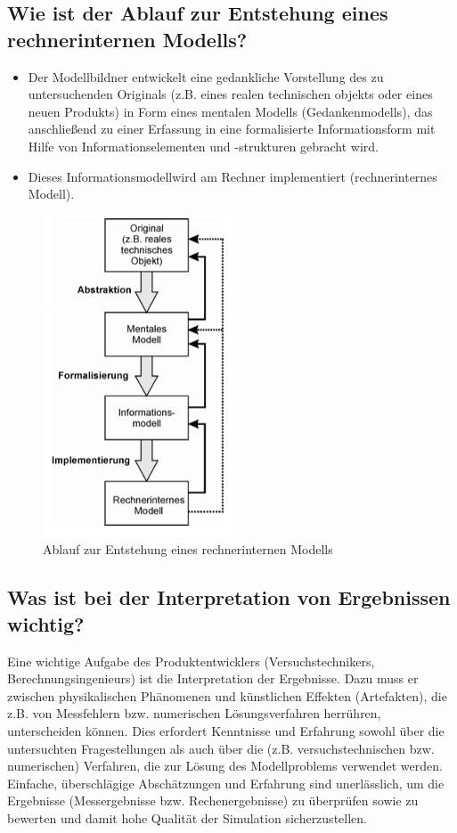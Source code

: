 \subsection{Wie ist der Ablauf zur Entstehung eines rechnerinternen Modells?}
\begin{itemize}
    \item Der Modellbildner entwickelt eine gedankliche Vorstellung des zu untersuchenden Originals (z.B. eines realen 
    technischen objekts oder eines neuen Produkts) in Form eines mentalen Modells (Gedankenmodells), das anschließend 
    zu einer Erfassung in eine formalisierte Informationsform mit Hilfe von Informationselementen und -strukturen gebracht wird.
    \item Dieses \glqq Informationsmodell\grqq wird am Rechner implementiert (rechnerinternes Modell).
\end{itemize}
\begin{figure}[H]
    \centering
    \includegraphics[width=0.3\linewidth]{Bilder/Teil4_RechnerinternesModell.png}
    \caption{Ablauf zur Entstehung eines rechnerinternen Modells}
\end{figure}

\subsection{Was ist bei der Interpretation von Ergebnissen wichtig?}
Eine wichtige Aufgabe des Produktentwicklers (Versuchstechnikers, Berechnungsingenieurs) ist die 
Interpretation der Ergebnisse. Dazu muss er zwischen physikalischen Phänomenen und künstlichen Effekten 
(Artefakten), die z.B. von Messfehlern bzw. numerischen Lösungsverfahren herrühren, unterscheiden können. Dies 
erfordert Kenntnisse und Erfahrung sowohl über die untersuchten Fragestellungen als auch über die (z.B. 
versuchstechnischen bzw. numerischen) Verfahren, die zur Lösung des Modellproblems verwendet werden. Einfache, 
überschlägige Abschätzungen und Erfahrung sind unerlässlich, um die Ergebnisse (Messergebnisse bzw. Rechenergebnisse) 
zu überprüfen sowie zu bewerten und damit hohe Qualität der Simulation sicherzustellen.

